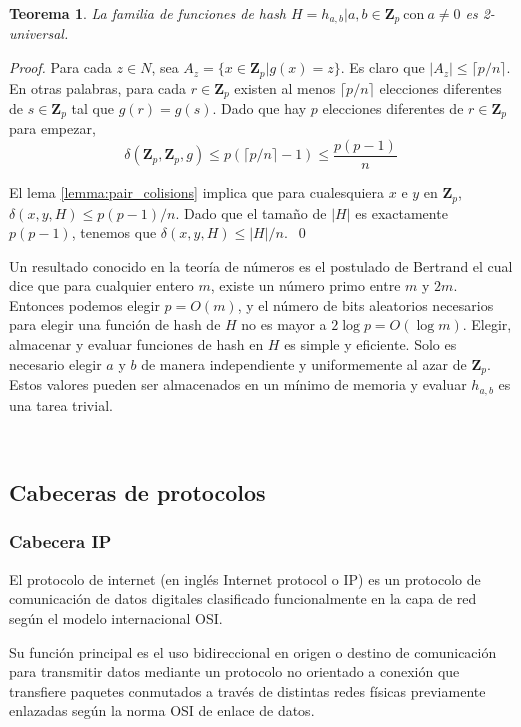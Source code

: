 \documentclass[a4paper,10pt, oneside]{article}
\newtheorem{theorem}{Teorema}[section]
\begin{document}
\begin{theorem}
	La familia de funciones de hash $H={h_{a,b} | a, b \in \mathbf{Z}_p \ \text{con} \ a \neq 0}$ es \textit{2-universal}.
\end{theorem}
\begin{proof}
	Para cada $z \in N$, sea $A_z = \{ x \in \mathbf{Z}_p | g(x) = z \}$. Es claro que $|A_z| \leq \lceil p/n \rceil$. En otras palabras, para cada $r \in \mathbf{Z}_p$ existen al menos $\lceil p/n \rceil$ elecciones diferentes de $s \in \mathbf{Z}_p$ tal que $g(r) = g(s)$. Dado que hay $p$ elecciones diferentes de $r \in \mathbf{Z}_p$ para empezar,
	\begin{equation}
		\delta(\mathbf{Z}_p,\mathbf{Z}_p,g) \leq p \left( \lceil p/n \rceil - 1 \right) \leq \frac{p(p-1)}{n}
	\end{equation}
	
	El lema \ref{lemma:pair_colisions} implica que para cualesquiera $x$ e $y$ en $\mathbf{Z}_p$, $\delta(x,y,H) \leq p(p-1)/n$. Dado que el tamaño de $|H|$ es exactamente $p(p-1)$, tenemos que $\delta(x,y,H) \leq |H|/n$. \qed
\end{proof}

Un resultado conocido en la teoría de números es el postulado de Bertrand el cual dice que para cualquier entero $m$, existe un número primo entre $m$ y $2m$. Entonces podemos elegir $p = O(m)$, y el número de bits aleatorios necesarios para elegir una función de hash de $H$ no es mayor a $2 \log p = O(\log m)$. Elegir, almacenar y evaluar funciones de hash en $H$ es simple y eficiente. Solo es necesario elegir $a$ y $b$ de manera independiente y uniformemente al azar de $\mathbf{Z}_p$. Estos valores pueden ser almacenados en un mínimo de memoria y evaluar $h_{a,b}$ es una tarea trivial.

\

\subsection{Cabeceras de protocolos}

\subsubsection{Cabecera IP}
El protocolo de internet (en inglés Internet protocol o IP) es un protocolo de comunicación de datos digitales clasificado funcionalmente en la capa de red según el modelo internacional OSI.

Su función principal es el uso bidireccional en origen o destino de comunicación para transmitir datos mediante un protocolo no orientado a conexión que transfiere paquetes conmutados a través de distintas redes físicas previamente enlazadas según la norma OSI de enlace de datos.
\end{document}
